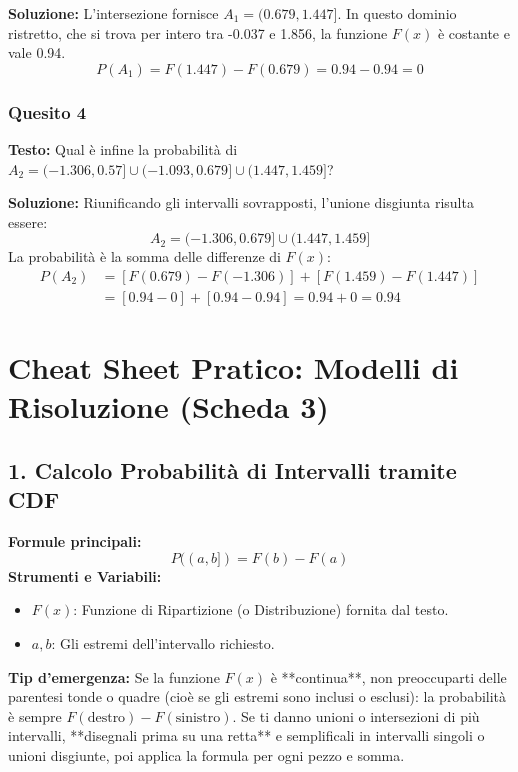 \documentclass[12pt, a4paper]{article}
\begin{document}
\textbf{Soluzione:}
L'intersezione fornisce $A_1 = (0.679, 1.447]$. In questo dominio ristretto, che si trova per intero tra -0.037 e 1.856, la funzione $F(x)$ è costante e vale 0.94.
$$P(A_1) = F(1.447) - F(0.679) = 0.94 - 0.94 = 0$$

\subsubsection*{Quesito 4}
\textbf{Testo:} Qual è infine la probabilità di $A_2 = (-1.306, 0.57] \cup (-1.093, 0.679] \cup (1.447, 1.459]$?

\textbf{Soluzione:}
Riunificando gli intervalli sovrapposti, l'unione disgiunta risulta essere:
$$A_2 = (-1.306, 0.679] \cup (1.447, 1.459]$$
La probabilità è la somma delle differenze di $F(x)$:
\begin{align*}
P(A_2) &= [F(0.679) - F(-1.306)] + [F(1.459) - F(1.447)] \\
&= [0.94 - 0] + [0.94 - 0.94] = 0.94 + 0 = 0.94
\end{align*}


\section*{Cheat Sheet Pratico: Modelli di Risoluzione (Scheda 3)}

\subsection*{1. Calcolo Probabilità di Intervalli tramite CDF}
\textbf{Formule principali:}
$$P((a,b])=F(b)-F(a)$$
\textbf{Strumenti e Variabili:}
\begin{itemize}
    \item $F(x)$: Funzione di Ripartizione (o Distribuzione) fornita dal testo.
    \item $a, b$: Gli estremi dell'intervallo richiesto.
\end{itemize}
\textbf{Tip d'emergenza:} Se la funzione $F(x)$ è **continua**, non preoccuparti delle parentesi tonde o quadre (cioè se gli estremi sono inclusi o esclusi): la probabilità è sempre $F(\text{destro}) - F(\text{sinistro})$. Se ti danno unioni o intersezioni di più intervalli, **disegnali prima su una retta** e semplificali in intervalli singoli o unioni disgiunte, poi applica la formula per ogni pezzo e somma.
\end{document}
